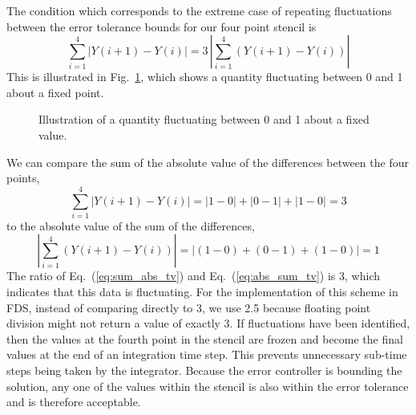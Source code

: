 The condition which corresponds to the extreme case of repeating fluctuations between the error tolerance bounds for our four
point stencil is
\begin{equation}\label{eq:TV}
\sum_{i=1}^{4}|Y(i+1)-Y(i)| = 3 \, |\sum_{i=1}^{4}(Y(i+1)-Y(i))|
\end{equation}
This is illustrated in Fig.~\ref{fig:TV}, which shows a quantity fluctuating between 0 and 1 about a fixed point.
\begin{figure}
\begin{center}
\caption{\label{fig:TV} Illustration of a quantity fluctuating between 0 and 1 about a fixed value.}
\end{center}
\end{figure}
We can compare the sum of the absolute value of the differences between the four points,
\begin{equation}\label{eq:sum_abs_tv}
\displaystyle \sum_{i=1}^{4}|Y(i+1)-Y(i)| = |1-0| + |0-1| + |1-0| = 3
\end{equation}
to the absolute value of the sum of the differences,
\begin{equation}\label{eq:abs_sum_tv}
|\displaystyle \sum_{i=1}^{4}(Y(i+1)-Y(i))| = |(1-0)+(0-1)+(1-0)| = 1
\end{equation}
The ratio of Eq.~(\ref{eq:sum_abs_tv}) and Eq.~(\ref{eq:abs_sum_tv}) is 3, which indicates that this data is fluctuating. For the
implementation of this scheme in FDS, instead of comparing directly to 3, we use 2.5 because floating point division might not
return a value of exactly 3. If fluctuations have been identified, then the values at the fourth point in the stencil are frozen
and become the final values at the end of an integration time step. This prevents unnecessary sub-time steps being taken by the
integrator. Because the error controller is bounding the solution, any one of the values within the stencil is also within the
error tolerance and is therefore acceptable.

